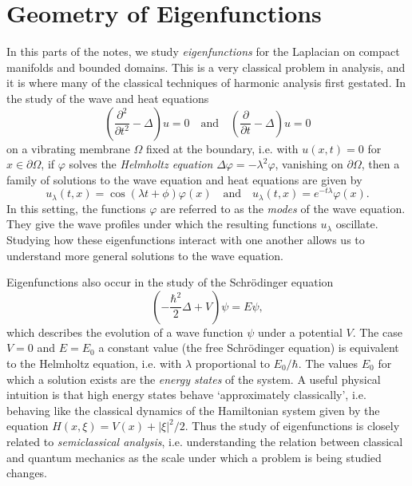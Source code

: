 
\part{Geometry of Eigenfunctions}



In this parts of the notes, we study \emph{eigenfunctions} for the Laplacian on compact manifolds and bounded domains. This is a very classical problem in analysis, and it is where many of the classical techniques of harmonic analysis first gestated. In the study of the wave and heat equations
%
\[ \left( \frac{\partial^2}{\partial t^2} - \Delta \right) u = 0 \quad\text{and}\quad \left( \frac{\partial}{\partial t} - \Delta \right) u = 0 \]
%
on a vibrating membrane $\Omega$ fixed at the boundary, i.e. with $u(x,t) = 0$ for $x \in \partial \Omega$, if $\varphi$ solves the \emph{Helmholtz equation} $\Delta \varphi = - \lambda^2 \varphi$, vanishing on $\partial \Omega$, then a family of solutions to the wave equation and heat equations are given by
%
\[ u_\lambda(t,x) = \cos(\lambda t + \phi) \varphi(x) \quad\text{and}\quad u_\lambda(t,x) = e^{-t \lambda} \varphi(x). \]
%
In this setting, the functions $\varphi$ are referred to as the \emph{modes} of the wave equation. They give the wave profiles under which the resulting functions $u_\lambda$ oscillate. Studying how these eigenfunctions interact with one another allows us to understand more general solutions to the wave equation.

Eigenfunctions also occur in the study of the Schr\"{o}dinger equation
%
\[ \left( - \frac{\hbar^2}{2} \Delta + V \right) \psi = E \psi, \]
%
which describes the evolution of a wave function $\psi$ under a potential $V$. The case $V = 0$ and $E = E_0$ a constant value (the free Schr\"{o}dinger equation) is equivalent to the Helmholtz equation, i.e. with $\lambda$ proportional to $E_0 / \hbar$. The values $E_0$ for which a solution exists are the \emph{energy states} of the system. A useful physical intuition is that high energy states behave `approximately classically', i.e. behaving like the classical dynamics of the Hamiltonian system given by the equation $H(x,\xi) = V(x) + |\xi|^2 / 2$. Thus the study of eigenfunctions is closely related to \emph{semiclassical analysis}, i.e. understanding the relation between classical and quantum mechanics as the scale under which a problem is being studied changes.









